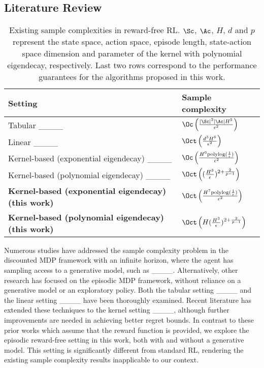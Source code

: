 \subsection{Literature Review} \label{appx:lit_review}
\begin{table}[h]
\caption{Existing sample complexities in reward-free RL. $\Sc$, $\Ac$, $H$, $d$ and $p$ represent the state space, action space, episode length, state-action space dimension and parameter of the kernel with polynomial eigendecay, respectively. Last two rows correspond to the performance guarantees for the algorithms proposed in this work.\\ }
\label{samplecomplexitytable}
\centering
\begin{tabular}{ll}
\hline
Setting      & Sample complexity                                                           \\ \hline
Tabular ____     & $\Oc\left(\frac{|\Sc|^2|\Ac| H^5}{\epsilon^2}\right)$                       \\
Linear ____       & $\Oct\left(\frac{d^3 H^6}{\epsilon^2}\right)$                                \\
Kernel-based (exponential eigendecay)  ____ & $\Oc\left(\frac{H^6 \text{polylog} (\frac{1}{\epsilon})}{\epsilon^2}\right)$ \\
Kernel-based (polynomial eigendecay) ____ 
&$\Oct\left((\frac{H^3}{\epsilon})^{2+\frac{2}{p-1}}\right)$  \\ \hline
\textbf{Kernel-based (exponential eigendecay) (this work)} & $\Oct\left(\frac{H^7 \text{polylog} (\frac{1}{\epsilon})}{\epsilon^2}\right)$ \\ 
\textbf{Kernel-based (polynomial eigendecay) (this work) }
&$\Oct \left(H(\frac{H^3}{\epsilon})^{2+\frac{2}{p-1}}\right)$  \\ \hline
\end{tabular}
\end{table}

Numerous studies have addressed the sample complexity problem in the discounted MDP framework with an infinite horizon, where the agent has sampling access to a generative model, such as ____. Alternatively, other research has focused on the episodic MDP framework, without reliance on a generative model or an exploratory policy. Both the tabular setting ____ and the linear setting ____ have been thoroughly examined. Recent literature has extended these techniques to the kernel setting ____, although further improvements are needed in achieving better regret bounds. In contrast to these prior works which assume that the reward function is provided, we explore the episodic reward-free setting in this work, both with and without a generative model. This setting is significantly different from standard RL, rendering the existing sample complexity results inapplicable to our context. 

